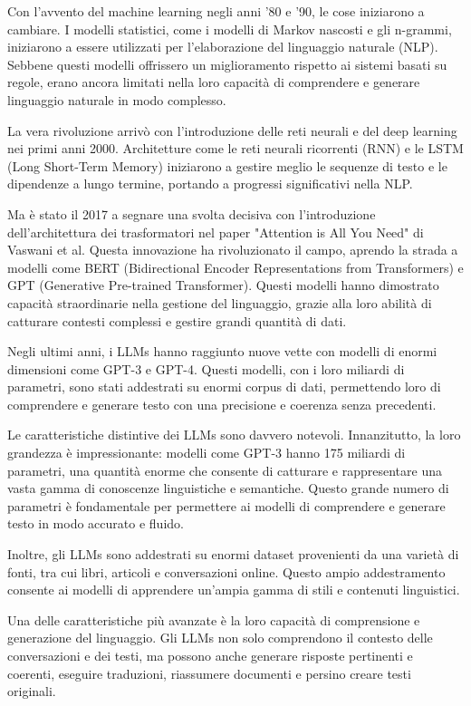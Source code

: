 \documentclass[a4paper,twoside,12pt]{toptesi}
\begin{document}
Con l'avvento del machine learning negli anni '80 e '90, le cose iniziarono a cambiare. I modelli statistici, come i modelli di Markov nascosti e gli n-grammi, iniziarono a essere utilizzati per l'elaborazione del linguaggio naturale (NLP). Sebbene questi modelli offrissero un miglioramento rispetto ai sistemi basati su regole, erano ancora limitati nella loro capacità di comprendere e generare linguaggio naturale in modo complesso.

La vera rivoluzione arrivò con l'introduzione delle reti neurali e del deep learning nei primi anni 2000. Architetture come le reti neurali ricorrenti (RNN) e le LSTM (Long Short-Term Memory) iniziarono a gestire meglio le sequenze di testo e le dipendenze a lungo termine, portando a progressi significativi nella NLP.

Ma è stato il 2017 a segnare una svolta decisiva con l'introduzione dell'architettura dei trasformatori nel paper "Attention is All You Need" di Vaswani et al. Questa innovazione ha rivoluzionato il campo, aprendo la strada a modelli come BERT (Bidirectional Encoder Representations from Transformers) e GPT (Generative Pre-trained Transformer). Questi modelli hanno dimostrato capacità straordinarie nella gestione del linguaggio, grazie alla loro abilità di catturare contesti complessi e gestire grandi quantità di dati.

Negli ultimi anni, i LLMs hanno raggiunto nuove vette con modelli di enormi dimensioni come GPT-3 e GPT-4. Questi modelli, con i loro miliardi di parametri, sono stati addestrati su enormi corpus di dati, permettendo loro di comprendere e generare testo con una precisione e coerenza senza precedenti.

Le caratteristiche distintive dei LLMs sono davvero notevoli. Innanzitutto, la loro grandezza è impressionante: modelli come GPT-3 hanno 175 miliardi di parametri, una quantità enorme che consente di catturare e rappresentare una vasta gamma di conoscenze linguistiche e semantiche. Questo grande numero di parametri è fondamentale per permettere ai modelli di comprendere e generare testo in modo accurato e fluido.

Inoltre, gli LLMs sono addestrati su enormi dataset provenienti da una varietà di fonti, tra cui libri, articoli e conversazioni online. Questo ampio addestramento consente ai modelli di apprendere un'ampia gamma di stili e contenuti linguistici.

Una delle caratteristiche più avanzate è la loro capacità di comprensione e generazione del linguaggio. Gli LLMs non solo comprendono il contesto delle conversazioni e dei testi, ma possono anche generare risposte pertinenti e coerenti, eseguire traduzioni, riassumere documenti e persino creare testi originali.
\end{document}
